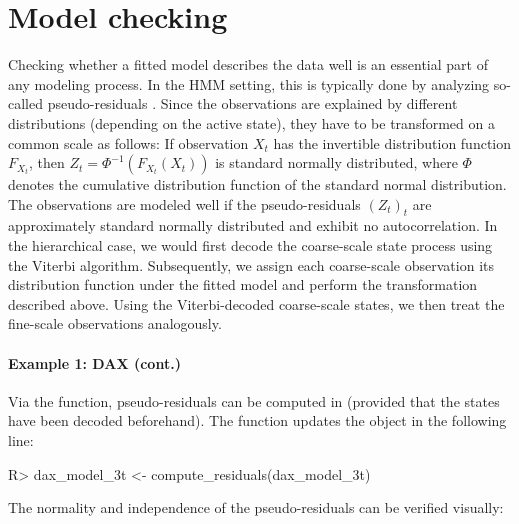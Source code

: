 \documentclass[article]{jss}
\newcommand{\fct}[1]{\code{#1()}}
\begin{document}
\section{Model checking} \label{sec:model_checking} %

Checking whether a fitted model describes the data well is an essential part of any modeling process. In the HMM setting, this is typically done by analyzing so-called pseudo-residuals \citep{zuc16}. Since the observations are explained by different distributions (depending on the active state), they have to be transformed on a common scale as follows: If observation $X_t$ has the invertible distribution function $F_{X_t}$, then $Z_t=\Phi^{-1}(F_{X_t} (X_t))$ is standard normally distributed, where $\Phi$ denotes the cumulative distribution function of the standard normal distribution. The observations are modeled well if the pseudo-residuals $(Z_t)_t$ are approximately standard normally distributed and exhibit no autocorrelation. In the hierarchical case, we would first decode the coarse-scale state process using the Viterbi algorithm. Subsequently, we assign each coarse-scale observation its distribution function under the fitted model and perform the transformation described above. Using the Viterbi-decoded coarse-scale states, we then treat the fine-scale observations analogously.

\paragraph{Example 1: DAX (cont.)}

Via the \fct{compute\_residuals} function, pseudo-residuals can be computed in  (provided that the states have been decoded beforehand). The function updates the  object in the following line:

%
\begin{Schunk}
\begin{Sinput}
R> dax_model_3t <- compute_residuals(dax_model_3t)
\end{Sinput}
\end{Schunk}
%

The normality and independence of the pseudo-residuals can be verified visually:
\end{document}
